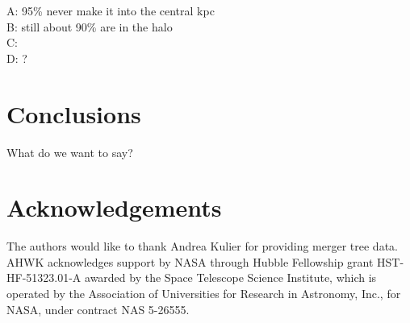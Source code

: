 \documentclass[english, apj]{emulateapj}
\begin{document}
A: 95\% never make it into the central kpc\\
B: still about 90\% are in the halo\\
C: \\
D: ?



\section{Conclusions}\label{sec:conclusions}
What do we want to say?



\section*{Acknowledgements}

The authors would like to thank Andrea Kulier for providing merger tree data. AHWK acknowledges support by NASA through Hubble Fellowship grant HST-HF-51323.01-A awarded by the Space Telescope Science Institute, which is operated by the Association of Universities for Research in Astronomy, Inc., for NASA, under contract NAS 5-26555. 








\end{document}
